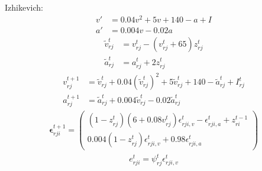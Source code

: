 \documentclass[t]{beamer}
\begin{document}
\begin{frame}
Izhikevich:
  \begin{align}
      v' &= 0.04v^2 + 5v + 140 - a + I\\
      a' &= 0.004v - 0.02a
      \end{align}
      \begin{align}
      \tilde{v}^t_{rj} &= v^t_{rj} - \left(v^t_{rj} + 65\right)z^t_{rj}\\
      \tilde{a}^t_{rj} &= a^t_{rj} + 2z^t_{rj}
      \end{align}
      \begin{align}
      v^{t+1}_{rj} &= \tilde{v}^t_{rj} + 0.04\left(\tilde{v}^t_{rj}\right)^2 + 5\tilde{v}^t_{rj} + 140 - \tilde{a}^t_{rj} + I^t_{rj}\\
      a^{t+1}_{rj} &= \tilde{a}^t_{rj} + 0.004\tilde{v}^t_{rj}-0.02\tilde{a}^t_{rj}
      \end{align}
      \begin{align}
          \bm{\epsilon}^{t+1}_{rji} = \begin{pmatrix}\left(1-z^t_{rj}\right)\left(6+0.08v^t_{rj}\right)\epsilon^t_{rji, v} -\epsilon^t_{rji, a} + z_{ri}^{t-1}\\
          0.004\left(1-z^t_{rj}\right)\epsilon^t_{rji, v} + 0.98\epsilon^t_{rji, a}
          \end{pmatrix}\label{eq:ml_izhikevich_evector}
          \end{align}
          \begin{align}
          e^t_{rji} = \psi^t_{rj}\epsilon^t_{rji, v}
          \end{align}
\end{frame}
\end{document}
